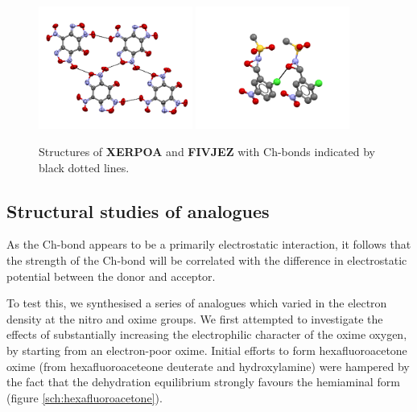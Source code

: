 \begin{refsection}
\begin{figure}
    \centering
    \includegraphics[width=0.45\textwidth]{Figures/XERPOA.png}
    \includegraphics[width=0.45\textwidth]{Figures/FIVJEZ.png}
    \caption{Structures of \textbf{XERPOA} and \textbf{FIVJEZ} with Ch-bonds indicated by black dotted lines.}
    \label{fig:furoxan-oxaziridine}
\end{figure}

\subsection{Structural studies of analogues}
As the Ch-bond appears to be a primarily electrostatic interaction, it follows that the strength of the Ch-bond will be correlated with the difference in electrostatic potential between the donor and acceptor.

To test this, we synthesised a series of analogues which varied in the electron density at the nitro and oxime groups.
We first attempted to investigate the effects of substantially increasing the electrophilic character of the oxime oxygen, by starting from an electron-poor oxime.
Initial efforts to form hexafluoroacetone oxime (from hexafluoroaceteone deuterate and hydroxylamine) were hampered by the fact that the dehydration equilibrium strongly favours the hemiaminal form (figure \ref{sch:hexafluoroacetone}).


\end{refsection}
